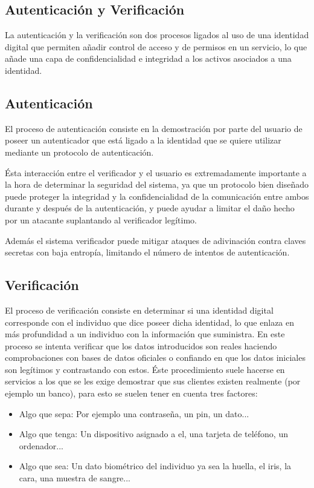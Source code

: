 \documentclass[12pt]{report}
\begin{document}
\subsection{Autenticación y Verificación}

La autenticación y la verificación son dos procesos ligados al uso de una identidad digital que permiten añadir control de acceso y de permisos en un servicio, lo que añade una capa de confidencialidad e integridad a los activos asociados a una identidad.

\subsection{Autenticación}

El proceso de autenticación consiste en la demostración por parte del usuario de poseer un autenticador que está ligado a la identidad que se quiere utilizar mediante un protocolo de autenticación.

Ésta interacción entre el verificador y el usuario es extremadamente importante a la hora de determinar la seguridad del sistema, ya que un protocolo bien diseñado puede proteger la integridad y la confidencialidad de la comunicación entre ambos durante y después de la autenticación, y puede ayudar a limitar el daño hecho por un atacante suplantando al verificador legítimo.

Además el sistema verificador puede mitigar ataques de adivinación contra claves secretas con baja entropía, limitando el número de intentos de autenticación.

\subsection{Verificación}

El proceso de verificación consiste en determinar si una identidad digital corresponde con el individuo que dice poseer dicha identidad, lo que enlaza en más profundidad a un individuo con la información que suministra. En este proceso se intenta verificar que los datos introducidos son reales haciendo comprobaciones con bases de datos oficiales o confiando en que los datos iniciales son legítimos y contrastando con estos. Éste procedimiento suele hacerse en servicios a los que se les exige demostrar que sus clientes existen realmente (por ejemplo un banco), para esto se suelen tener en cuenta tres factores:

\begin{itemize}
\item
Algo que sepa: Por ejemplo una contraseña, un pin, un dato...
\item
Algo que tenga: Un dispositivo asignado a el, una tarjeta de teléfono, un ordenador...
\item
Algo que sea: Un dato biométrico del individuo ya sea la huella, el iris, la cara, una muestra de sangre...
\end{itemize}
\end{document}
